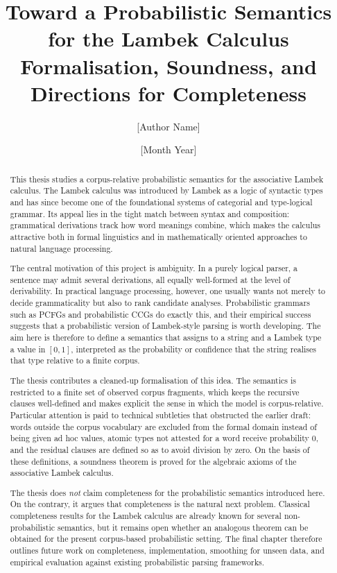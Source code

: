 \documentclass[12pt,a4paper]{report}
\title{Toward a Probabilistic Semantics for the Lambek Calculus\\\large Formalisation, Soundness, and Directions for Completeness}
\author{[Author Name]}
\date{[Month Year]}
\theoremstyle{definition}
\begin{document}
\maketitle
{}

\begin{abstract}
This thesis studies a corpus-relative probabilistic semantics for the associative Lambek
calculus. The Lambek calculus was introduced by Lambek as a logic of syntactic types and has
since become one of the foundational systems of categorial and type-logical grammar.
Its appeal lies in the tight match between syntax and composition: grammatical derivations
track how word meanings combine, which makes the calculus attractive both in formal
linguistics and in mathematically oriented approaches to natural language processing.

The central motivation of this project is ambiguity. In a purely logical parser, a sentence may
admit several derivations, all equally well-formed at the level of derivability. In practical
language processing, however, one usually wants not merely to decide grammaticality but also
to rank candidate analyses. Probabilistic grammars such as PCFGs and probabilistic CCGs do
exactly this, and their empirical success suggests that a probabilistic version of Lambek-style
parsing is worth developing. The aim here is therefore to define a semantics that assigns to a
string and a Lambek type a value in $[0,1]$, interpreted as the probability or confidence that
the string realises that type relative to a finite corpus.

The thesis contributes a cleaned-up formalisation of this idea. The semantics is restricted to a
finite set of observed corpus fragments, which keeps the recursive clauses well-defined and makes
explicit the sense in which the model is corpus-relative. Particular attention is paid to technical
subtleties that obstructed the earlier draft: words outside the corpus vocabulary are excluded
from the formal domain instead of being given ad hoc values, atomic types not attested for a
word receive probability $0$, and the residual clauses are defined so as to avoid division by
zero. On the basis of these definitions, a soundness theorem is proved for the algebraic axioms
of the associative Lambek calculus.

The thesis does \emph{not} claim completeness for the probabilistic semantics introduced here.
On the contrary, it argues that completeness is the natural next problem. Classical completeness
results for the Lambek calculus are already known for several non-probabilistic semantics, but
it remains open whether an analogous theorem can be obtained for the present corpus-based
probabilistic setting. The final chapter therefore outlines future work on completeness,
implementation, smoothing for unseen data, and empirical evaluation against existing
probabilistic parsing frameworks.
\end{abstract}
\end{document}
